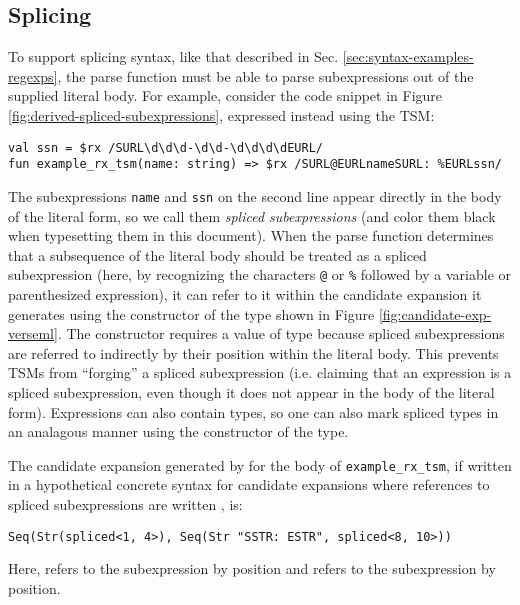 \subsection{Splicing}\label{sec:splicing-and-hygiene}
To support splicing syntax, like that described in Sec. \ref{sec:syntax-examples-regexps}, the parse function must be able to parse subexpressions out of the supplied literal body. For example, consider the code snippet in Figure \ref{fig:derived-spliced-subexpressions}, expressed instead using the  TSM:
\begin{lstlisting}[numbers=none]
val ssn = $rx /SURL\d\d\d-\d\d-\d\d\d\dEURL/
fun example_rx_tsm(name: string) => $rx /SURL@EURLnameSURL: %EURLssn/
\end{lstlisting}
The subexpressions \lstinline{name} and \lstinline{ssn} on the second line appear directly in the body of the literal form, so we call them \emph{spliced subexpressions} (and color them black when typesetting them in this document). When the parse function determines that a subsequence of the literal body should be treated as a spliced subexpression (here, by recognizing the characters \lstinline{@} or \lstinline{%} followed by a variable or parenthesized expression), 
it can refer to it within the candidate expansion it generates using the  constructor of the  type shown in Figure \ref{fig:candidate-exp-verseml}. The  constructor requires a value of type  because spliced subexpressions are referred to indirectly by their position within the literal body. This prevents TSMs from ``forging'' a spliced subexpression (i.e. claiming that an expression is a spliced subexpression, even though it does not appear in the body of the literal form). Expressions can also contain types, so one can also mark spliced types in an analagous manner using the  constructor of the  type. %

The candidate expansion generated by  for the body of \lstinline{example_rx_tsm}, if written in a hypothetical concrete syntax for candidate expansions where references to spliced subexpressions are written , is:
\begin{lstlisting}[numbers=none]
Seq(Str(spliced<1, 4>), Seq(Str "SSTR: ESTR", spliced<8, 10>))
\end{lstlisting}
Here,  refers to the subexpression  by position and  refers to the subexpression  by position. 

